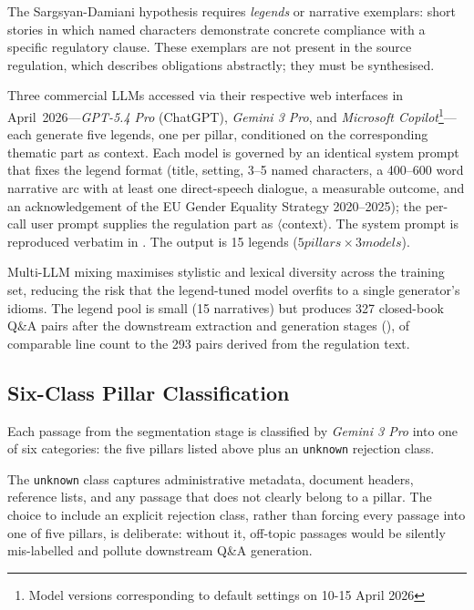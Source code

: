 \documentclass[pdflatex, sn-apa]{sn-jnl}%
\theoremstyle{thmstyleone}%
\theoremstyle{thmstyletwo}%
\theoremstyle{thmstylethree}%
\begin{document}
The Sargsyan-Damiani hypothesis requires \emph{legends} or narrative exemplars:
short stories in which named characters demonstrate concrete compliance with a
specific regulatory clause. These exemplars are not present in the source
regulation, which describes obligations abstractly; they must be synthesised.

Three commercial LLMs accessed via their respective web interfaces in
April~2026---\textit{GPT-5.4 Pro} (ChatGPT), \textit{Gemini 3 Pro}, and
\textit{Microsoft Copilot}\footnote{Model versions corresponding to default
settings on 10-15 April 2026}---each generate five legends, one per pillar,
conditioned on the corresponding thematic part as context. Each model is
governed by an identical system prompt that fixes the legend format (title,
setting, 3--5 named characters, a 400--600 word narrative arc with at least one
direct-speech dialogue, a measurable outcome, and an acknowledgement of the EU
Gender Equality Strategy 2020--2025); the per-call user prompt supplies the
regulation part as $\langle$context$\rangle$. The system prompt is reproduced
verbatim in . The output is 15 legends ($5
pillars \times 3 models$).

Multi-LLM mixing maximises stylistic and lexical diversity across the training
set, reducing the risk that the legend-tuned model overfits to a single
generator's idioms. The legend pool is small (15 narratives) but produces 327
closed-book Q\&A pairs after the downstream extraction and generation stages
(), of comparable line count to the 293 pairs
derived from the regulation text.

\subsection{Six-Class Pillar Classification}
\label{sec:method:pillar}

Each passage from the segmentation stage is classified by \textit{Gemini 3 Pro}
into one of six categories: the five pillars listed above plus an
\texttt{unknown} rejection class. 

The \texttt{unknown} class captures administrative metadata, document headers,
reference lists, and any passage that does not clearly belong to a pillar. The
choice to include an explicit rejection class, rather than forcing every passage
into one of five pillars, is deliberate: without it, off-topic passages would be
silently mis-labelled and pollute downstream Q\&A generation.
\end{document}
